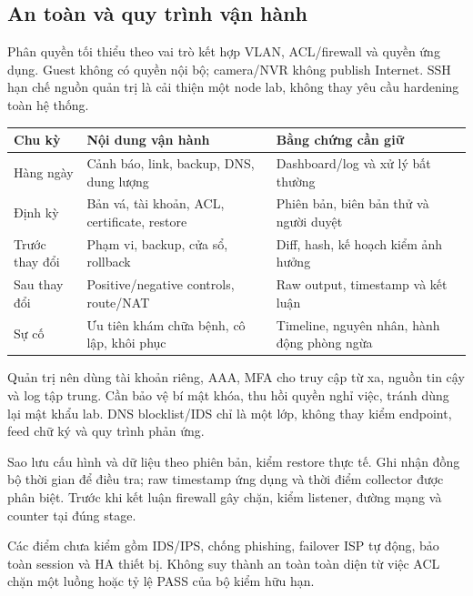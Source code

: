 \documentclass[
  11pt,
]{article}
\begin{document}
\subsection{An toàn và quy trình vận hành}
Phân quyền tối thiểu theo vai trò kết hợp VLAN, ACL/firewall và quyền ứng dụng. Guest không có quyền nội bộ; camera/NVR không publish Internet. SSH hạn chế nguồn quản trị là cải thiện một node lab, không thay yêu cầu hardening toàn hệ thống.
\par\noindent
{}
\begin{tabularx}{\linewidth}{@{}lXX@{}}\toprule
Chu kỳ & Nội dung vận hành & Bằng chứng cần giữ\\\midrule
Hàng ngày & Cảnh báo, link, backup, DNS, dung lượng & Dashboard/log và xử lý bất thường\\
Định kỳ & Bản vá, tài khoản, ACL, certificate, restore & Phiên bản, biên bản thử và người duyệt\\
Trước thay đổi & Phạm vi, backup, cửa sổ, rollback & Diff, hash, kế hoạch kiểm ảnh hưởng\\
Sau thay đổi & Positive/negative controls, route/NAT & Raw output, timestamp và kết luận\\
Sự cố & Ưu tiên khám chữa bệnh, cô lập, khôi phục & Timeline, nguyên nhân, hành động phòng ngừa\\\bottomrule\end{tabularx}\par

Quản trị nên dùng tài khoản riêng, AAA, MFA cho truy cập từ xa, nguồn tin cậy và log tập trung. Cần bảo vệ bí mật khóa, thu hồi quyền nghỉ việc, tránh dùng lại mật khẩu lab. DNS blocklist/IDS chỉ là một lớp, không thay kiểm endpoint, feed chữ ký và quy trình phản ứng.

Sao lưu cấu hình và dữ liệu theo phiên bản, kiểm restore thực tế. Ghi nhận đồng bộ thời gian để điều tra; raw timestamp ứng dụng và thời điểm collector được phân biệt. Trước khi kết luận firewall gây chặn, kiểm listener, đường mạng và counter tại đúng stage.

Các điểm chưa kiểm gồm IDS/IPS, chống phishing, failover ISP tự động, bảo toàn session và HA thiết bị. Không suy thành an toàn toàn diện từ việc ACL chặn một luồng hoặc tỷ lệ PASS của bộ kiểm hữu hạn.

\clearpage
\end{document}

